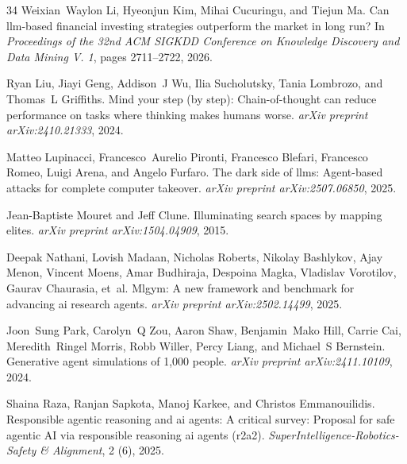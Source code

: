 \begin{thebibliography}{34}
Weixian~Waylon Li, Hyeonjun Kim, Mihai Cucuringu, and Tiejun Ma.
\newblock Can llm-based financial investing strategies outperform the market in long run?
\newblock In \emph{Proceedings of the 32nd ACM SIGKDD Conference on Knowledge Discovery and Data Mining V. 1}, pages 2711--2722, 2026.

Ryan Liu, Jiayi Geng, Addison~J Wu, Ilia Sucholutsky, Tania Lombrozo, and Thomas~L Griffiths.
\newblock Mind your step (by step): Chain-of-thought can reduce performance on tasks where thinking makes humans worse.
\newblock \emph{arXiv preprint arXiv:2410.21333}, 2024.

Matteo Lupinacci, Francesco~Aurelio Pironti, Francesco Blefari, Francesco Romeo, Luigi Arena, and Angelo Furfaro.
\newblock The dark side of llms: Agent-based attacks for complete computer takeover.
\newblock \emph{arXiv preprint arXiv:2507.06850}, 2025.

Jean-Baptiste Mouret and Jeff Clune.
\newblock Illuminating search spaces by mapping elites.
\newblock \emph{arXiv preprint arXiv:1504.04909}, 2015.

Deepak Nathani, Lovish Madaan, Nicholas Roberts, Nikolay Bashlykov, Ajay Menon, Vincent Moens, Amar Budhiraja, Despoina Magka, Vladislav Vorotilov, Gaurav Chaurasia, et~al.
\newblock Mlgym: A new framework and benchmark for advancing ai research agents.
\newblock \emph{arXiv preprint arXiv:2502.14499}, 2025.

Joon~Sung Park, Carolyn~Q Zou, Aaron Shaw, Benjamin~Mako Hill, Carrie Cai, Meredith~Ringel Morris, Robb Willer, Percy Liang, and Michael~S Bernstein.
\newblock Generative agent simulations of 1,000 people.
\newblock \emph{arXiv preprint arXiv:2411.10109}, 2024.

Shaina Raza, Ranjan Sapkota, Manoj Karkee, and Christos Emmanouilidis.
\newblock Responsible agentic reasoning and ai agents: A critical survey: Proposal for safe agentic {AI} via responsible reasoning ai agents (r2a2).
\newblock \emph{SuperIntelligence-Robotics-Safety \& Alignment}, 2 (6), 2025.


\end{thebibliography}
